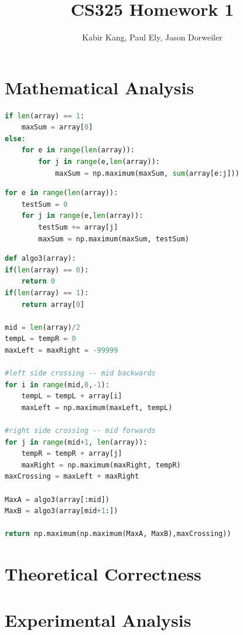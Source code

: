 \documentclass[a4paper,12pt]{article}
\title{CS325 Homework 1}
\author{Kabir Kang, Paul Ely, Jason Dorweiler}
\begin{document}
\maketitle

\section*{Mathematical Analysis}
  \begin{lstlisting}[language=python,caption={pseudo code for $n^3$ algorithm}]
if len(array) == 1:
	maxSum = array[0]
else:
	for e in range(len(array)):
		for j in range(e,len(array)):
			maxSum = np.maximum(maxSum, sum(array[e:j]))
  \end{lstlisting}
  
  \begin{lstlisting}[language=python,caption={pseudo code for $n^2$ algorithm}]
for e in range(len(array)):
	testSum = 0
	for j in range(e,len(array)):
		testSum += array[j]
		maxSum = np.maximum(maxSum, testSum)
  \end{lstlisting}

  \begin{lstlisting}[language=python,caption={pseudo code for $n\log(n)$ algorithm}]
def algo3(array):
if(len(array) == 0):
	return 0
if(len(array) == 1):
	return array[0]

mid = len(array)/2
tempL = tempR = 0
maxLeft = maxRight = -99999

#left side crossing -- mid backwards
for i in range(mid,0,-1):
	tempL = tempL + array[i]
	maxLeft = np.maximum(maxLeft, tempL)

#right side crossing -- mid forwards
for j in range(mid+1, len(array)):
	tempR = tempR + array[j]
	maxRight = np.maximum(maxRight, tempR)
maxCrossing = maxLeft + maxRight

MaxA = algo3(array[:mid])
MaxB = algo3(array[mid+1:])

return np.maximum(np.maximum(MaxA, MaxB),maxCrossing))
  \end{lstlisting} 

\section*{Theoretical Correctness}

\section*{Experimental Analysis}
\end{document}
